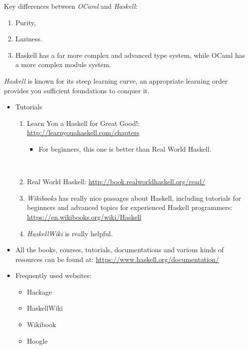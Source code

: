 \documentclass{article}
\begin{document}
\begin{itemize}
    Key differences between \emph{OCaml} and \emph{Haskell}:
    \begin{enumerate}
        \item Purity,
        \item Laziness.
        \item Haskell has a far more complex and advanced type system, while OCaml has a more complex module system.
    \end{enumerate}
    
    \emph{Haskell} is known for its steep learning curve, an appropriate learning order provides you sufficient foundations to conquer it.
    \begin{itemize}
        \item Tutorials
        \begin{enumerate}
            \item Learn You a Haskell for Great Good!:
            \href{http://learnyouahaskell.com/chapters}{http://learnyouahaskell.com/chapters}
            \begin{itemize}
                \item For beginners, this one is better than Real World Haskell.
            \end{itemize}\
            \item Real World Haskell:
            \href{http://book.realworldhaskell.org/read/}{http://book.realworldhaskell.org/read/}
            \item \emph{Wikibooks} has really nice passages about Haskell, including tutorials for beginners and advanced topics for experienced Haskell programmers:\\
            \href{https://en.wikibooks.org/wiki/Haskell}{https://en.wikibooks.org/wiki/Haskell}
            \item \emph{HaskellWiki} is really helpful.
        \end{enumerate}
        \item All the books, courses, tutorials, documentations and various kinds of resources can be found at:
        \href{https://www.haskell.org/documentation/}{https://www.haskell.org/documentation/}
        \item Frequently used websites:
        \begin{itemize}
            \item Hackage
            \item HaskellWiki
            \item Wikibook
            \item Hoogle

\end{itemize}
\end{itemize}
\end{itemize}
\end{document}

